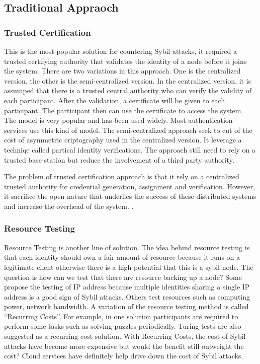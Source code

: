 \documentclass[conference]{IEEEtran}
\begin{document}
\subsection{Traditional Appraoch}

\subsubsection{Trusted Certification}
This is the most popular solution for countering Sybil attacks, it required a trusted certifying authority that validates the identity of a node before it joins the system. There are two variations in this approach. One is the centralized version, the other is the semi-centralized version. In the centralized version, it is assumped that there is a trusted central authority who can verify the validity of each participant. After the validation, a certificate will be given to each participant. The participant then can use the certificate to access the system. The model is very popular and has been used widely. Most authentication services use this kind of model. The semi-centralized approach seek to cut of the cost of asymmetric criptography used in the centralized version. It leverage a techniqe called partical identity verifications. The approach still need to rely on a trusted base station but reduce the involvement of a third party authority.

The problem of  trusted certification approach is that it rely on a centralized trusted authority for credential generation, assignment and verification. However, it sacrifice the open nature that underlies the success of these distributed systems and increase the overhead of the system. \cite{newsome04sybil}\cite{Castro02Secure}\cite{Adya02FFA}.

\subsubsection{Resource Testing}
Resource Testing is another line of solution. The idea behind resource testing is that each identity should own a fair amount of resource because it runs on a legitimate cilent otherwise there is a high potential that this is a sybil node. The question is how can we test that there are resource backing up a node? Some propose the testing of IP address because multiple identities sharing a single IP address is a good sign of Sybil attacks. Others test resources such as computing power, network bandwidth. A variation of the resource testing method is called “Recurring Costs”. For example, in one solution participants are required to perform some tasks such as solving puzzles\cite{Borisov06CPS} periodically. Turing tests are also suggested as a recurring cost solution\cite{Ahn03CUH}. With Recurring Costs, the cost of Sybil attacks have become more expensive but would the benefit still outweight the cost? Cloud services have definitely help drive down the cost of Sybil attacks.
\end{document}
